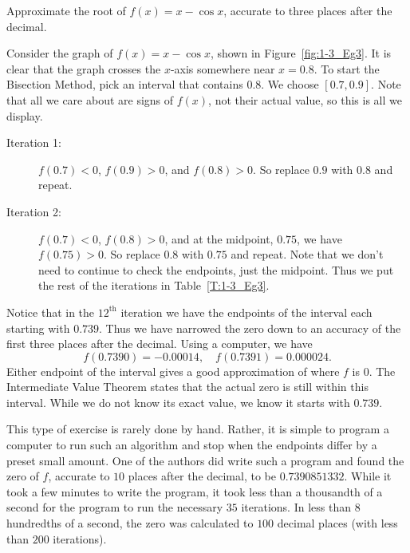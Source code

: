 \begin{example}   %
Approximate the root of $f(x) = x-\cos x$, accurate to three places after the decimal.

\solution Consider the graph of $f(x) = x-\cos x$, shown in Figure~\ref{fig:1-3_Eg3}. It is clear that the graph crosses the $x$-axis somewhere near $x=0.8$. To start the Bisection Method, pick an interval that contains $0.8$. We choose $[0.7,0.9]$. Note that all we care about are signs of $f(x)$, not their actual value, so this is all we display.

\begin{description}
\item[Iteration 1:] $f(0.7) < 0$, $f(0.9) > 0$, and $f(0.8) >0$. So replace $0.9$ with $0.8$ and repeat.
\item[Iteration 2:] $f(0.7)<0$, $f(0.8) > 0$, and at the midpoint, $0.75$, we have $f(0.75) >0 $. So replace $0.8$ with $0.75$ and repeat. Note that we don't need to continue to check the endpoints, just the midpoint. Thus we put the rest of the iterations in Table~\ref{T:1-3_Eg3}.
\end{description}

Notice that in the $12^{\text{th}}$ iteration we have the endpoints of the interval each starting with $0.739$. Thus we have narrowed the zero down to an accuracy of the first three places after the decimal. Using a computer, we have 
\[ f(0.7390) = -0.00014, \quad f(0.7391) = 0.000024. \] 
Either endpoint of the interval gives a good approximation of where $f$ is $0$. The Intermediate Value Theorem states that the actual zero is still within this interval. While we do not know its exact value, we know it starts with $0.739$. 

This type of exercise is rarely done by hand. Rather, it is simple to program a computer to run such an algorithm and stop when the endpoints differ by a preset small amount. One of the authors did write such a program and found the zero of $f$, accurate to $10$ places after the decimal, to be $0.7390851332$. While it took a few minutes to write the program, it took less than a thousandth of a second for the program to run the necessary $35$ iterations. In less than $8$ hundredths of a second, the zero was calculated to $100$ decimal places (with less than $200$ iterations).
\end{example}
